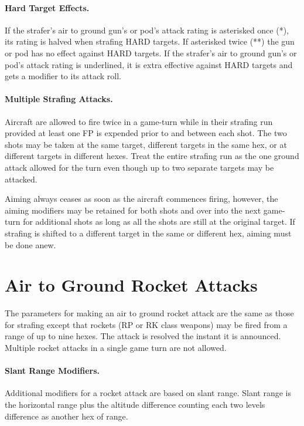 \paragraph{Hard Target Effects.} If the strafer's air to ground gun's or pod's attack rating is asterisked once (*), its rating is halved when strafing HARD targets. If asterisked twice (**) the gun or pod has no effect against HARD targets. If the strafer's air to ground gun's or pod's attack rating is underlined, it is extra effective against HARD targets and gets a  modifier to its attack roll.

\paragraph{Multiple Strafing Attacks.} Aircraft are allowed to fire twice in a game-turn while in their strafing run provided at least one FP is expended prior to and between each shot. The two shots may be taken at the same target, different targets in the same hex, or at different targets in different hexes. Treat the entire strafing run as the one ground attack allowed for the turn even though up to two separate targets may be attacked.

Aiming always ceases as soon as the aircraft commences firing, however, the aiming modifiers may be retained for both shots and over into the next game-turn for additional shots as long as all the shots are still at the original target. If strafing is shifted to a different target in the same or different hex, aiming must be done anew.

\section{Air to Ground Rocket Attacks}



The parameters for making an air to ground rocket attack are the same as those for strafing except that rockets (RP or RK class weapons) may be fired from a range of up to nine hexes. The attack is resolved the instant it is announced. Multiple rocket attacks in a single game turn are not allowed.

\paragraph{Slant Range Modifiers.} Additional modifiers for a rocket attack are based on slant range. Slant range is the horizontal range plus the altitude difference counting each two levels difference as another hex of range.

